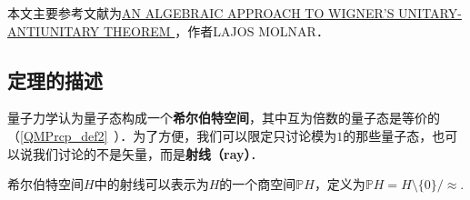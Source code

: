 



本文主要参考文献为\href{https://arxiv.org/abs/math/9808033}{AN ALGEBRAIC APPROACH TO WIGNER’S
UNITARY-ANTIUNITARY THEOREM
}，作者LAJOS MOLNAR．

\subsection{定理的描述}

量子力学认为量子态构成一个\textbf{希尔伯特空间}，其中互为倍数的量子态是等价的（\autoref{QMPrcp_def2}~）．为了方便，我们可以限定只讨论模为$1$的那些量子态，也可以说我们讨论的不是矢量，而是\textbf{射线（ray）}．

希尔伯特空间$H$中的射线可以表示为$H$的一个商空间$\mathbb{P}H$，定义为${\displaystyle \mathbb {P} H=H\setminus \{0\}/{\approx }.}$































